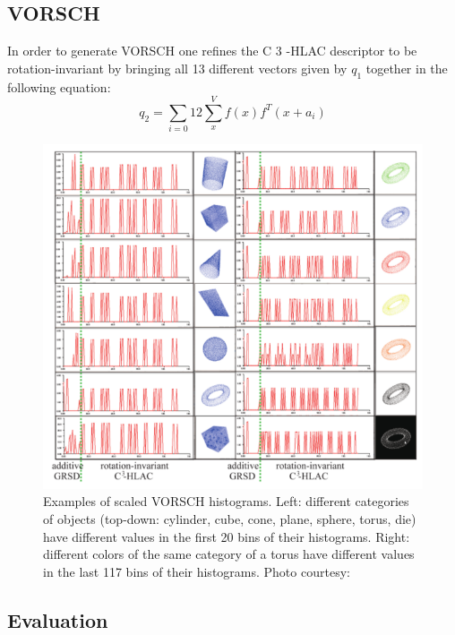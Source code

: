 \documentclass[runningheads,a4paper]{llncs}
\begin{document}
{\subsection{VORSCH}
In order to generate VORSCH one refines the C 3 -HLAC descriptor to be rotation-invariant by bringing all 13 different vectors given by \(q_1\) together in the following equation:
\[q_2=\sum_{i=0}{12} \sum_x^V f(x)f^T(x+a_i)\]

\begin{figure}[!htbp]
    \centering
    \includegraphics[width=1\linewidth]{pic/vorsch.png}
    \caption{Examples of scaled VORSCH histograms. Left: different categories of objects (top-down: cylinder, cube, cone, plane, sphere, torus, die) have different values in the first 20 bins of their histograms. Right: different colors of the same category of a torus have different values in the last 117 bins of their histograms. Photo courtesy: \citep{Marton2012} }
    \label{fig::photo_nuts}    
\end{figure}
\subsection{Evaluation}

}
\end{document}
